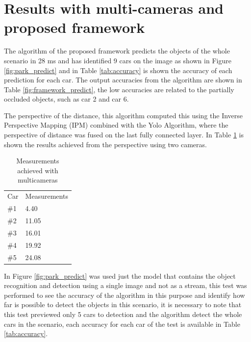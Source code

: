 \section{Results with multi-cameras and proposed framework}


The algorithm of the proposed framework predicts the objects of the whole scenario in 28 ms and has identified 9 cars on the image as shown in Figure \ref{fig:park_predict} and in Table \ref{tab:accuracy} is shown the accuracy of each prediction for each car. The output accuracies from the algorithm are shown in Table \ref{fig:framework_predict}, the low accuracies are related to the partially occluded objects, such as car 2 and car 6. 

The perspective of the distance, this algorithm computed this using the Inverse Perspective Mapping (IPM) combined with the Yolo Algorithm, where the perspective of distance was fused on the last fully connected layer. In Table \ref{tab:output_framework} is shown the results achieved from the perspective using two cameras. 

\begin{table}[H]
\centering
\caption{Measurements achieved with multicameras}
\begin{tabular}{l|l} 
\toprule
Car &  Measurements      \\
\#1   & 4.40        \\
\#2   & 11.05       \\
\#3   & 16.01       \\
\#4   & 19.92       \\
\#5   & 24.08       \\
\bottomrule
\end{tabular}
\label{tab:output_framework}
\end{table} 
 

In Figure \ref{fig:park_predict} was used just the model that contains the object recognition and detection using a single image and not as a stream, this test was performed to see the accuracy of the algorithm in this purpose and identify how far is possible to detect the objects in this scenario, it is necessary to note that this test previewed only 5 cars to detection and the algorithm detect the whole cars in the scenario, each accuracy for each car of the test is available in Table \ref{tab:accuracy}.


